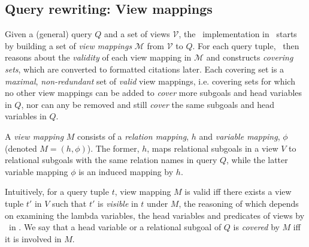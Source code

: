 \subsection{Query rewriting:  View mappings}
Given a (general) query $Q$ and a set of views $\mathcal{V}$, the \rba\ implementation in~\cite{wu2018data} starts by building a set of \textit{view mappings} $\mathcal{M}$ from $\mathcal{V}$ to $Q$. For each query tuple, \rba\ then reasons about the {\em validity} of each view mapping in $\mathcal{M}$ and constructs {\em covering sets}, which are converted to formatted citations later. Each covering set is a \textit{maximal}, \textit{non-redundant} set of {\em valid} view mappings,
i.e. covering sets for which no other view mappings can be added to \textit{cover} more subgoals and head variables in $Q$, nor can any be removed and still \textit{cover} the same subgoals and head variables in $Q$.

A \textit{view mapping} $M$ consists of a {\em relation mapping}, $h$ and {\em variable mapping}, $\phi$ (denoted $M=(h, \phi)$). The former, $h$, maps relational subgoals in a view $V$ to relational subgoals with the same relation names in query $Q$, while the latter variable mapping $\phi$ is an induced mapping by $h$. 

Intuitively, for a query tuple $t$, view mapping $M$ is valid iff there exists a view tuple $t'$ in $V$ such that $t'$ is {\em visible} in $t$ under $M$, the reasoning of which depends on examining the lambda variables, the head variables and predicates of views by \rba\ in \cite{wu2018data}. We say that a head variable or a relational subgoal of $Q$ is {\em covered} by $M$ iff it is involved in $M$.

 


